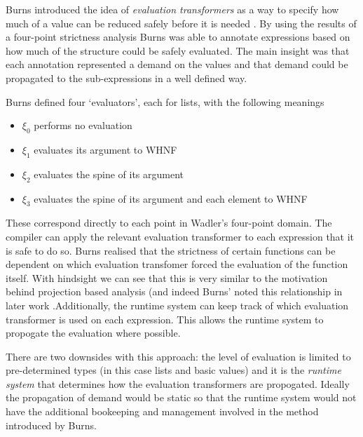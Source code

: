 Burns introduced the idea of \emph{evaluation transformers} as a way to specify
how much of a value can be reduced safely before it is needed
\citep{burn1987evaluation}. By using the results of a four-point strictness
analysis Burns was able to annotate expressions based on how much of the
structure could be safely evaluated. The main insight was that each annotation
represented a demand on the values and that demand could be propagated to the
sub-expressions in a well defined way.

Burns defined four `evaluators', each for lists, with the following meanings


\begin{itemize}
    \item $\xi_{0}$ performs no evaluation
    \item $\xi_{1}$ evaluates its argument to WHNF
    \item $\xi_{2}$ evaluates the spine of its argument
    \item $\xi_{3}$ evaluates the spine of its argument and each element to WHNF
\end{itemize}

These correspond directly to each point in Wadler's four-point domain. The
compiler can apply the relevant evaluation transformer to each expression that
it is safe to do so. Burns realised that the strictness of certain functions
can be dependent on which evaluation transfomer forced the evaluation of the
function itself. With hindsight we can see that this is very similar to the
motivation behind projection based analysis (and indeed Burns' noted this
relationship in later work .Additionally, the runtime system can keep track of which evaluation
transformer is used on each expression. This allows the runtime system to
propogate the evaluation where possible.

There are two downsides with this approach: the level of evaluation is limited
to pre-determined types (in this case lists and basic values) and it is the
\emph{runtime system} that determines how the evaluation transformers are
propogated. Ideally the propagation of demand would be static so that the
runtime system would not have the additional bookeeping and management involved
in the method introduced by Burns.
